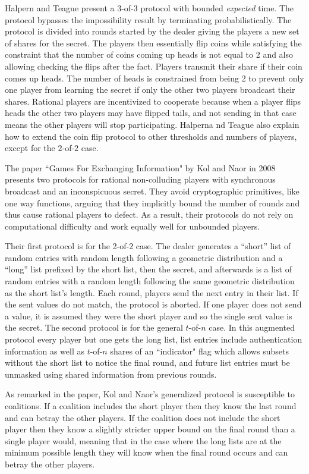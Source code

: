 \documentclass{dalcsthesis}
\begin{document}
Halpern and Teague present a 3-of-3 protocol with bounded \emph{expected} time. The protocol bypasses the impossibility result by terminating probabilistically. The protocol is divided into rounds started by the dealer giving the players a new set of shares for the secret. The players then essentially flip coins while satisfying the constraint that the number of coins coming up heads is not equal to 2 and also allowing checking the flips after the fact. Players transmit their share if their coin comes up heads. The number of heads is constrained from being 2 to prevent only one player from learning the secret if only the other two players broadcast their shares. Rational players are incentivized to cooperate because when a player flips heads the other two players may have flipped tails, and not sending in that case means the other players will stop participating. Halperna nd Teague also explain how to extend the coin flip protocol to other thresholds and numbers of players, except for the $2$-of-$2$ case.

The paper ``Games For Exchanging Information" \cite{kol08} by Kol and Naor in 2008 presents two protocols for rational non-colluding players with synchronous broadcast and an inconspicuous secret. They avoid cryptographic primitives, like one way functions, arguing that they implicitly bound the number of rounds and thus cause rational players to defect. As a result, their protocols do not rely on computational difficulty and work equally well for unbounded players.

Their first protocol is for the 2-of-2 case. The dealer generates a ``short'' list of random entries with random length following a geometric distribution and a ``long'' list prefixed by the short list, then the secret, and afterwards is a list of random entries with a random length following the same geometric distribution as the short list's length. Each round, players send the next entry in their list. If the sent values do not match, the protocol is aborted. If one player does not send a value, it is assumed they were the short player and so the single sent value is the secret. The second protocol is for the general $t$-of-$n$ case. In this augmented protocol every player but one gets the long list, list entries include authentication information as well as $t$-of-$n$ shares of an ``indicator" flag which allows subsets without the short list to notice the final round, and future list entries must be unmasked using shared information from previous rounds.

As remarked in the paper, Kol and Naor's generalized protocol is susceptible to coalitions. If a coalition includes the short player then they know the last round and can betray the other players. If the coalition does not include the short player then they know a slightly stricter upper bound on the final round than a single player would, meaning that in the case where the long lists are at the minimum possible length they will know when the final round occurs and can betray the other players.
\end{document}
